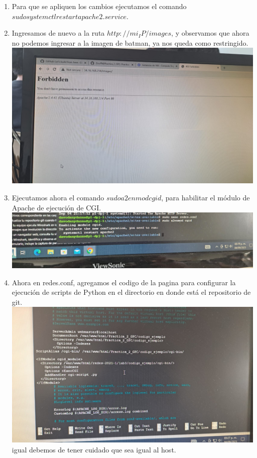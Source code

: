 \documentclass[12pt]{article}
\begin{document}
\begin{enumerate}
    \item Para que se apliquen los cambios ejecutamos el comando $sudo systemctl restart apache2.service.$\\
    \item Ingresamos de nuevo a la ruta $http://mi_IP/images$, y observamos que ahora no podemos ingresar a la imagen de batman, ya nos queda como restringido.\\
    \textbf{\includegraphics[scale = 0.30]{images/p16.jpeg}}\\
    \item Ejecutamos ahora  el comando $sudo a2enmod cgid$, para habilitar el módulo de Apache de ejecución de CGI.\\
    \textbf{\includegraphics[scale = 0.55]{images/p17.jpeg}}\\
    \item Ahora en redes.conf, agregamos el codigo de la pagina para configurar la ejecución de scripts de Python en el directorio en donde está el repositorio de git.\\
    \textbf{\includegraphics[scale = 0.30]{images/p18.jpeg}}\\ igual debemos de tener cuidado que sea igual al host.\\

\end{enumerate}
\end{document}

